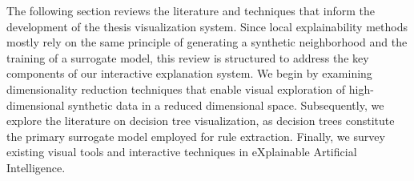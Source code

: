 The following section reviews the literature and techniques that inform the development of the thesis visualization system. Since local explainability methods mostly rely on the same principle of generating a synthetic neighborhood and the training of a surrogate model, this review is structured to address the key components of our interactive explanation system. We begin by examining dimensionality reduction techniques that enable visual exploration of high-dimensional synthetic data in a reduced dimensional space. Subsequently, we explore the literature on decision tree visualization, as decision trees constitute the primary surrogate model employed for rule extraction. Finally, we survey existing visual tools and interactive techniques in eXplainable Artificial Intelligence.